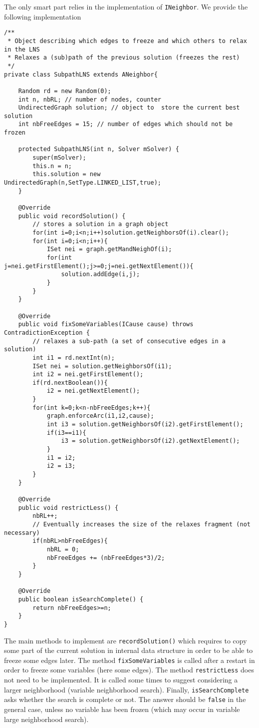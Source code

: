 \documentclass{article}
\begin{document}
The only smart part relies in the implementation of \texttt{INeighbor}. We provide the following implementation
\begin{lstlisting}
/**
 * Object describing which edges to freeze and which others to relax in the LNS
 * Relaxes a (sub)path of the previous solution (freezes the rest)
 */
private class SubpathLNS extends ANeighbor{

	Random rd = new Random(0);
	int n, nbRL; // number of nodes, counter 
	UndirectedGraph solution; // object to  store the current best solution
	int nbFreeEdges = 15; // number of edges which should not be frozen

	protected SubpathLNS(int n, Solver mSolver) {
		super(mSolver);
		this.n = n;
		this.solution = new UndirectedGraph(n,SetType.LINKED_LIST,true);
	}

	@Override
	public void recordSolution() {
		// stores a solution in a graph object
		for(int i=0;i<n;i++)solution.getNeighborsOf(i).clear();
		for(int i=0;i<n;i++){
			ISet nei = graph.getMandNeighOf(i);
			for(int j=nei.getFirstElement();j>=0;j=nei.getNextElement()){
				solution.addEdge(i,j);
			}
		}
	}

	@Override
	public void fixSomeVariables(ICause cause) throws ContradictionException {
		// relaxes a sub-path (a set of consecutive edges in a solution)
		int i1 = rd.nextInt(n);
		ISet nei = solution.getNeighborsOf(i1);
		int i2 = nei.getFirstElement();
		if(rd.nextBoolean()){
			i2 = nei.getNextElement();
		}
		for(int k=0;k<n-nbFreeEdges;k++){
			graph.enforceArc(i1,i2,cause);
			int i3 = solution.getNeighborsOf(i2).getFirstElement();
			if(i3==i1){
				i3 = solution.getNeighborsOf(i2).getNextElement();
			}
			i1 = i2;
			i2 = i3;
		}
	}

	@Override
	public void restrictLess() {
		nbRL++;
		// Eventually increases the size of the relaxes fragment (not necessary)
		if(nbRL>nbFreeEdges){
			nbRL = 0;
			nbFreeEdges += (nbFreeEdges*3)/2;
		}
	}

	@Override
	public boolean isSearchComplete() {
		return nbFreeEdges>=n;
	}
}
\end{lstlisting}

The main methods to implement are \texttt{recordSolution()} which requires to copy some part of the current solution in internal data structure in order to be able to freeze some edges later. 
The method \texttt{fixSomeVariables} is called after a restart in order to freeze some variables (here some edges). The method \texttt{restrictLess} does not need to be implemented. It is called some times to suggest considering a larger neighborhood (variable neighborhood search). Finally, \texttt{isSearchComplete} asks whether the search is complete or not. The answer should be \texttt{false} in the general case, unless no variable has been frozen (which may occur in variable large neighborhood search). 
\end{document}

